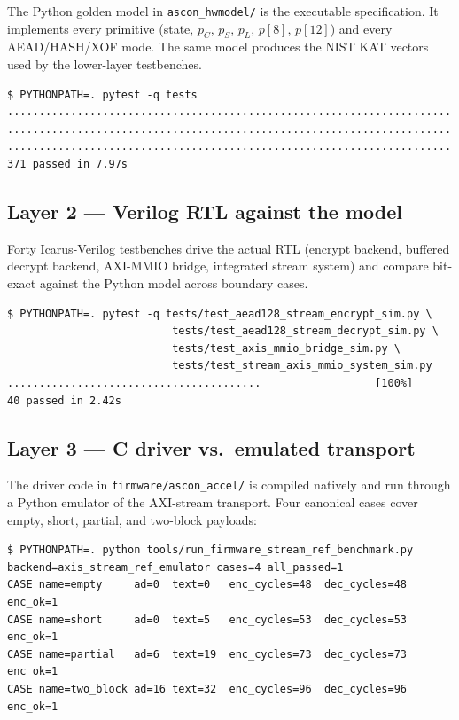 \documentclass[11pt,a4paper]{article}
\begin{document}
The Python golden model in \texttt{ascon\_hwmodel/} is the executable
specification. It implements every primitive (state, $p_C$, $p_S$, $p_L$,
$p[8]$, $p[12]$) and every AEAD/HASH/XOF mode. The same model produces
the NIST KAT vectors used by the lower-layer testbenches.

\begin{lstlisting}[language=shell]
$ PYTHONPATH=. pytest -q tests
......................................................................
......................................................................
......................................................................
371 passed in 7.97s
\end{lstlisting}

\subsection{Layer 2 --- Verilog RTL against the model}

Forty Icarus-Verilog testbenches drive the actual RTL (encrypt backend,
buffered decrypt backend, AXI-MMIO bridge, integrated stream system) and
compare bit-exact against the Python model across boundary cases.

\begin{lstlisting}[language=shell]
$ PYTHONPATH=. pytest -q tests/test_aead128_stream_encrypt_sim.py \
                          tests/test_aead128_stream_decrypt_sim.py \
                          tests/test_axis_mmio_bridge_sim.py \
                          tests/test_stream_axis_mmio_system_sim.py
........................................                  [100%]
40 passed in 2.42s
\end{lstlisting}

\subsection{Layer 3 --- C driver vs.\ emulated transport}

The driver code in \texttt{firmware/ascon\_accel/} is compiled natively
and run through a Python emulator of the AXI-stream transport. Four
canonical cases cover empty, short, partial, and two-block payloads:

\begin{lstlisting}[language=shell]
$ PYTHONPATH=. python tools/run_firmware_stream_ref_benchmark.py
backend=axis_stream_ref_emulator cases=4 all_passed=1
CASE name=empty     ad=0  text=0   enc_cycles=48  dec_cycles=48  enc_ok=1
CASE name=short     ad=0  text=5   enc_cycles=53  dec_cycles=53  enc_ok=1
CASE name=partial   ad=6  text=19  enc_cycles=73  dec_cycles=73  enc_ok=1
CASE name=two_block ad=16 text=32  enc_cycles=96  dec_cycles=96  enc_ok=1
\end{lstlisting}
\end{document}
